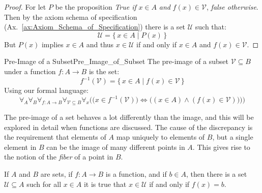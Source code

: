         \begin{proof}
            For let $P$ be the proposition \textit{True if} $x\in{A}$
            \textit{and} $f(x)\in\mathcal{V}$, \textit{false otherwise}. Then
            by the axiom schema of specification
            (Ax.~\ref{ax:Axiom_Schema_of_Specification}) there is a set
            $\mathcal{U}$ such that:
            \begin{equation*}
                \mathcal{U}=\big\{\,x\in{A}\;|\;P(x)\,\big\}
            \end{equation*}
            But $P(x)$ implies $x\in{A}$ and thus $x\in\mathcal{U}$ if and only
            if $x\in{A}$ and $f(x)\in\mathcal{V}$.
        \end{proof}
        \begin{fdefinition}{Pre-Image of a Subset}{Pre_Image_of_Subset}
            The \gls{pre-image} of a \gls{subset} $\mathcal{V}\subseteq{B}$
            under a \gls{function} $f:A\rightarrow{B}$ is the set:
            \begin{equation}
                f^{\minus{1}}(\mathcal{V})
                =\big\{\,x\in{A}\;|\;f(x)\in\mathcal{V}\,\big\}
            \end{equation}
            Using our formal language:
            \begin{equation*}
                \forall_{A}\forall_{B}\forall_{f:A\rightarrow{B}}
                \forall_{\mathcal{V}\subseteq{B}}\forall_{x}\Big(
                    \big(x\in{f}^{\minus{1}}(\mathcal{V})\big)
                    \Longleftrightarrow
                    \big((x\in{A})\land(f(x)\in\mathcal{V}))\big)\Big)
            \end{equation*}
        \end{fdefinition}
        The pre-image of a set behaves a lot differently than the image, and
        this will be explored in detail when functions are discussed. The cause
        of the discrepancy is the requirement that elements of $A$ map uniquely
        to elements of $B$, but a single element in $B$ can be the image of
        many different points in $A$. This gives rise to the notion of the
        \textit{fiber} of a point in $B$.
        \begin{theorem}
            If $A$ and $B$ are sets, if $f:A\rightarrow{B}$ is a function, and
            if $b\in{A}$, then there is a set $\mathcal{U}\subseteq{A}$ such
            for all $x\in{A}$ it is true that $x\in\mathcal{U}$ if and only if
            $f(x)=b$.
        \end{theorem}

